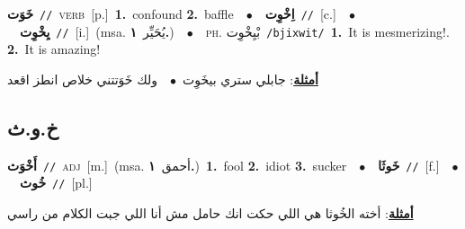 \documentclass[10pt,a4paper,twoside]{article} %
\begin{document}
\begin{multicols}{2}
{\setlength\topsep{0pt}\textbf{\foreignlanguage{arabic}{خَوَت}}\ {\color{gray}\texttt{//}\color{black}}\ \textsc{verb}\ [p.]\ \textbf{1.}~confound  \textbf{2.}~baffle\ \ $\bullet$\ \ \setlength\topsep{0pt}\textbf{\foreignlanguage{arabic}{اِخْوِت}}\ {\color{gray}\texttt{//}\color{black}}\ [c.]\ \ $\bullet$\ \ \setlength\topsep{0pt}\textbf{\foreignlanguage{arabic}{يِخْوِت}}\ {\color{gray}\texttt{//}\color{black}}\ [i.]\ \color{gray}(msa. \foreignlanguage{arabic}{يُحَيِّر}~\foreignlanguage{arabic}{\textbf{١.}})\color{black}\ \ $\bullet$\ \ \textsc{ph.} \color{gray} \foreignlanguage{arabic}{بْيِخْوِت}\color{black}\ {\color{gray}\texttt{/{\sffamily bjixwit}/}\color{black}}\ \textbf{1.}~It is mesmerizing!.  \textbf{2.}~It is amazing!\  \begin{flushright}\color{gray}\foreignlanguage{arabic}{\textbf{\underline{\foreignlanguage{arabic}{أمثلة}}}: جابلي ستري بيخَوِت\ $\bullet$\ \  ولك خَوَتتني خلاص انطز اقعد}\end{flushright}\color{black}} \vspace{2mm}

\vspace{-3mm}
\subsection*{\color{blue}\foreignlanguage{arabic}{خ.و.ث}\color{blue}{}} 

{\setlength\topsep{0pt}\textbf{\foreignlanguage{arabic}{أَخْوَث}}\ {\color{gray}\texttt{//}\color{black}}\ \textsc{adj}\ [m.]\ \color{gray}(msa. \foreignlanguage{arabic}{أحمق}~\foreignlanguage{arabic}{\textbf{١.}})\color{black}\ \textbf{1.}~fool  \textbf{2.}~idiot  \textbf{3.}~sucker\ \ $\bullet$\ \ \setlength\topsep{0pt}\textbf{\foreignlanguage{arabic}{خَوثَا}}\ {\color{gray}\texttt{//}\color{black}}\ [f.]\ \ $\bullet$\ \ \setlength\topsep{0pt}\textbf{\foreignlanguage{arabic}{خُوث}}\ {\color{gray}\texttt{//}\color{black}}\ [pl.]\  \begin{flushright}\color{gray}\foreignlanguage{arabic}{\textbf{\underline{\foreignlanguage{arabic}{أمثلة}}}: أخته الخُوثا هي اللي حكت انك حامل مش أنا اللي جبت الكلام من راسي}\end{flushright}\color{black}} \vspace{2mm}


\end{multicols}
\end{document}
